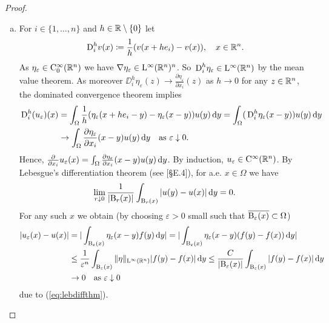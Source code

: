 \begin{proof}
  \begin{enumerate}[a)]
    \item For $i \in \{1, \dots, n\}$ and $h \in \mathbb{R} \setminus\{0\}$ let
    $$
    \,{\operatorname{D}}^h_i v(x) \coloneqq \frac{1}{h} ( v(x + h e_i) - v(x)), \quad x \in \mathbb{R}^n.
    $$
    As $\eta_\varepsilon \in \mathrm{C}_0^\infty(\mathbb{R}^n)$ we have $\nabla \eta_\varepsilon \in \mathrm{L}^\infty(\mathbb{R}^n)^n$.
    So $\,{\operatorname{D}}_i^h  \eta_\varepsilon \in \mathrm{L}^\infty(\mathbb{R}^n)$ by the mean value theorem.
    As moreover $\DD_i^h \eta_\varepsilon(z) \to \frac{\partial \eta_\varepsilon}{\partial x_i}(z)$ as $h \to 0$ for any $z \in \mathbb{R}^n$, the dominated convergence theorem implies
    \begin{align*}
      \,{\operatorname{D}}_i^h (u_\varepsilon)(x)
    &= \int_\Omega \frac{1}{h} (\eta_\varepsilon(x + h e_i - y) - \eta_\varepsilon (x - y)) u(y) \, {\operatorname{d}\!{y}} 
    = \int_\Omega (\,{\operatorname{D}}_i^h \eta_\varepsilon (x - y)) u(y) \, {\operatorname{d}\!{y}}  \\
    &\to \int_\Omega \frac{\partial \eta_\varepsilon}{\partial x_i}(x - y) u(y) \, {\operatorname{d}\!{y}} \quad\text{as } \varepsilon \downarrow 0.
    \end{align*}
    Hence, $\frac{\partial}{\partial x_i} u_\varepsilon(x) = \int_\Omega \frac{\partial \eta_\varepsilon}{\partial x_i} (x - y) u(y) \, {\operatorname{d}\!{y}}$.
    By induction, $u_\varepsilon \in \mathrm{C}^\infty(\mathbb{R}^n)$.
    By Lebesgue's differentiation theorem (see \cite{evans2010partial}[\S E.4]), for a.e. $x \in \Omega$ we have
    \begin{equation}
      \lim_{r \downarrow 0} \frac{1}{|\mathrm{B}_r(x)|} \int_{\mathrm{B}_r(x)} |u(y) - u(x)| \, {\operatorname{d}\!{y}} = 0.
      \label{eq:lebdiffthm}
    \end{equation}
    For any such $x$ we obtain (by choosing $\varepsilon > 0$ small such that $\overline{\mathrm{B}_\varepsilon(x)} \subset \Omega$)
    \begin{align}
      |u_\varepsilon(x) - u(x)|
      &= | \int_{\mathrm{B}_\varepsilon(x)} \eta_\varepsilon (x - y) f(y) \, {\operatorname{d}\!{y}} | 
      = | \int_{\mathrm{B}_\varepsilon(x)} \eta_\varepsilon (x - y) (f(y) - f(x)) \, {\operatorname{d}\!{y}} | \nonumber\\
      &\leq \frac{1}{\varepsilon^n} \int_{\mathrm{B}_\varepsilon(x)} \|\eta\|_{\mathrm{L}^\infty(\mathbb{R}^n)} |f(y) - f(x)| \, {\operatorname{d}\!{y}} \leq \frac{C}{|\mathrm{B}_\varepsilon(x)|} \int_{\mathrm{B}_\varepsilon(x)} |f(y) - f(x) | \, {\operatorname{d}\!{y}} \label{eq:pointwise}\\
      & \to 0 \quad\text{as } \varepsilon \downarrow 0 \nonumber
    \end{align}
    due to (\ref{eq:lebdiffthm}).
    

\end{enumerate}
\end{proof}
